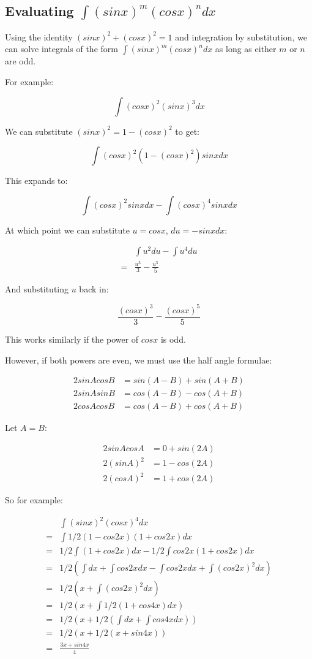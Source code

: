 \documentclass{article}
\begin{document}
\subsection{Evaluating $\int (sinx)^m (cosx)^ndx$}

Using the identity $(sinx)^2 + (cosx)^2 = 1$ and integration by
substitution, we can solve integrals of the form $\int (sinx)^m
(cosx)^ndx$ as long as either $m$ or $n$ are odd.

For example:

\[
\int (cosx)^2(sinx)^3dx
\]

We can substitute $(sinx)^2 = 1 - (cosx)^2$ to get:

\[
\int (cosx)^2 (1-(cosx)^2) sinx dx
\]

This expands to:

\[
\int (cosx)^2 sinx dx - \int (cosx)^4 sinx dx
\]

At which point we can substitute $u = cosx$, $du = -sinx dx$:

\begin{align*}
  &\int u^2 du - \int u^4 du \\
  = &\frac{u^3}{3} - \frac{u^5}{5}
\end{align*}

And substituting $u$ back in:

\[
\frac{(cosx)^3}{3} - \frac{(cosx)^5}{5}
\]

This works similarly if the power of $cosx$ is odd.

\newpage

However, if both powers are even, we must use the half angle formulae:

\begin{align*}
  2 sinA cosB &= sin(A - B) + sin(A + B) \\
  2 sinA sinB &= cos(A - B) - cos(A + B) \\
  2 cosA cosB &= cos(A - B) + cos(A + B)
\end{align*}

Let $A=B$:

\begin{align*}
  2 sinA cosA &= 0 + sin(2A) \\
  2 (sinA)^2 &= 1 - cos(2A) \\
  2 (cosA)^2 &= 1 + cos(2A)
\end{align*}

So for example:

\begin{align*}
  &\int (sinx)^2 (cosx)^4 dx \\
  = &\int 1/2(1 - cos2x) (1 + cos2x) dx \\
  = &1/2 \int (1 + cos2x) dx - 1/2 \int cos2x (1 + cos2x) dx \\
  = &1/2 ( \int dx + \int cos2x dx - \int cos2x dx + \int (cos2x)^2 dx ) \\
  = &1/2 ( x + \int (cos2x)^2 dx ) \\
  = &1/2 ( x + \int 1/2 (1 + cos4x) dx ) \\
  = &1/2 ( x + 1/2 ( \int dx + \int cos4x dx ) ) \\
  = &1/2 ( x + 1/2 ( x + sin4x ) ) \\
  = & \frac{ 3x + sin4x }{4}
\end{align*}
\end{document}
